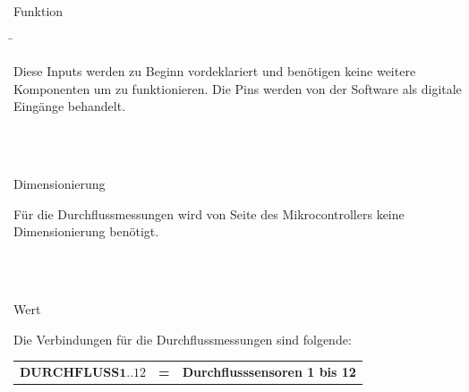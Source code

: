 \begin{tabbing}
\parbox[t]{.25\textwidth}{

Funktion

} \=\parbox[t]{.75\textwidth}{

Diese Inputs werden zu Beginn vordeklariert und benötigen keine weitere Komponenten um zu funktionieren. Die Pins werden von der Software als digitale Eingänge behandelt.

}\\
\\
\parbox[t]{.25\textwidth}{

Dimensionierung

} \>\parbox[t]{.75\textwidth}{

Für die Durchflussmessungen wird von Seite des Mikrocontrollers keine Dimensionierung benötigt.

}\\
\\
\parbox[t]{.25\textwidth}{

Wert

} \>\parbox[t]{.75\textwidth}{

Die Verbindungen für die Durchflussmessungen sind folgende:

\begin{tabular}{lll}
$\mathbf{DURCHFLUSS1..12}$ & \textbf{=} &  \textbf{Durchflusssensoren 1 bis 12} \\
\end{tabular}

}
\end{tabbing}
